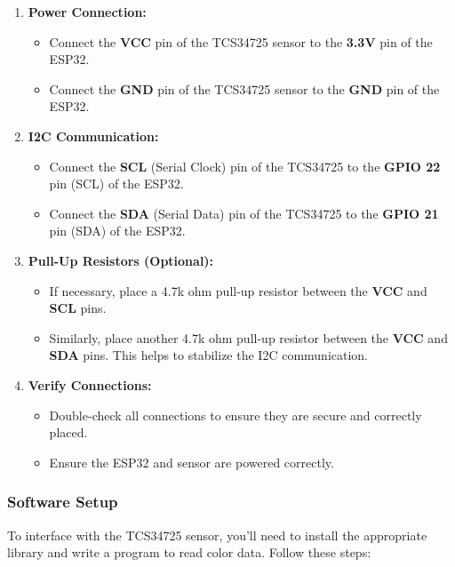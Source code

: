 \begin{enumerate}[label=\arabic*.]
	\item \textbf{Power Connection:}
	\begin{itemize}
		\item Connect the \textbf{VCC} pin of the TCS34725 sensor to the \textbf{3.3V} pin of the ESP32.
		\item Connect the \textbf{GND} pin of the TCS34725 sensor to the \textbf{GND} pin of the ESP32.
	\end{itemize}
	
	\item \textbf{I2C Communication:}
	\begin{itemize}
		\item Connect the \textbf{SCL} (Serial Clock) pin of the TCS34725 to the \textbf{GPIO 22} pin (SCL) of the ESP32.
		\item Connect the \textbf{SDA} (Serial Data) pin of the TCS34725 to the \textbf{GPIO 21} pin (SDA) of the ESP32.
	\end{itemize}
	
	\item \textbf{Pull-Up Resistors (Optional):}
	\begin{itemize}
		\item If necessary, place a 4.7k ohm pull-up resistor between the \textbf{VCC} and \textbf{SCL} pins.
		\item Similarly, place another 4.7k ohm pull-up resistor between the \textbf{VCC} and \textbf{SDA} pins. This helps to stabilize the I2C communication.
	\end{itemize}
	
	\item \textbf{Verify Connections:}
	\begin{itemize}
		\item Double-check all connections to ensure they are secure and correctly placed.
		\item Ensure the ESP32 and sensor are powered correctly.
	\end{itemize}
\end{enumerate}

\subsubsection*{Software Setup}

To interface with the TCS34725 sensor, you'll need to install the appropriate library and write a program to read color data. Follow these steps:

